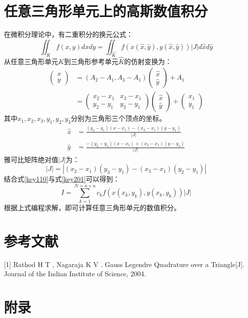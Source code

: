 \documentclass{article}                          %
\numberwithin{equation}{subsection}              %
\begin{document}
\section{任意三角形单元上的高斯数值积分}
在微积分理论中，有二重积分的换元公式：
\begin{equation}\label{key201}
\iint_K f(x,y)dxdy=\iint_{\hat{K}} f(x(\hat{x},\hat{y}),y(\hat{x},\hat{y}))|J|d\hat{x}d\hat{y}
\end{equation}
从任意三角形单元$ K $到三角形参考单元$ \hat{K} $的仿射变换为：
	\begin{equation}\label{key}
	\begin{aligned}
	\left(\begin{array}{l}
	x \\
	y
	\end{array}\right) &=\left(A_{2}-A_{1}, A_{3}-A_{1}\right)\left(\begin{array}{l}
	\hat{x} \\
	\hat{y}
	\end{array}\right)+A_{1} \\
	&=\left(\begin{array}{ll}
	x_{2}-x_{1} & x_{3}-x_{1} \\
	y_{2}-y_{1} & y_{3}-y_{1}
	\end{array}\right)\left(\begin{array}{l}
	\hat{x} \\
	\hat{y}
	\end{array}\right)+\left(\begin{array}{l}
	x_{1} \\
	y_{1}
	\end{array}\right)
	\end{aligned}
	\end{equation}
	其中$ x_1,x_2,x_3,y_1,y_2,y_3$分别为三角形三个顶点的坐标。
	\begin{equation}\label{key}
	\begin{aligned}
	\hat{x} &=\frac{\left(y_{3}-y_{1}\right)\left(x-x_{1}\right)-\left(x_{3}-x_{1}\right)\left(y-y_{1}\right)}{|J|} \\
	\hat{y} &=\frac{-\left(y_{2}-y_{1}\right)\left(x-x_{1}\right)+\left(x_{2}-x_{1}\right)\left(y-y_{1}\right)}{|J|}
	\end{aligned}
	\end{equation}
	雅可比矩阵绝对值$ |J| $为：
	\begin{equation}\label{key}
	|J|=|\left(x_{2}-x_{1}\right)\left(y_{3}-y_{1}\right)-\left(x_{3}-x_{1}\right)\left(y_{2}-y_{1}\right)|
	\end{equation}	
结合式\ref{key110}与式\ref{key201}可以得到：
\begin{equation}\label{key}
I=\sum_{k=1}^{N=n\times n}c_k f(x(x_k,y_k),y(x_k,y_k))|J|
\end{equation}
根据上式编程求解，即可计算任意三角形单元的数值积分。
\section{参考文献}
[1] Rathod H T ,  Nagaraja K V . Gauss Legendre Quadrature over a Triangle[J]. Journal of the Indian Institute of Science, 2004.
\section{附录}

	
\end{document}

